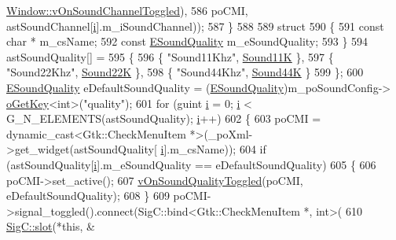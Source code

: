 \begin{DoxyCode}
{{      \mbox{\hyperlink{class_v_b_a_1_1_window_aa64899ec70d7a82ab4eee24567585f3b}{Window::vOnSoundChannelToggled}}),
586                                       poCMI, astSoundChannel[\mbox{\hyperlink{expr-lex_8cpp_acb559820d9ca11295b4500f179ef6392}{i}}].m\_iSoundChannel));
587   \}
588 
589   \textcolor{keyword}{struct}
590   \{
591     \textcolor{keyword}{const} \textcolor{keywordtype}{char} *        m\_csName;
592     \textcolor{keyword}{const} \mbox{\hyperlink{class_v_b_a_1_1_window_a320f2aa064d602888b12cdd2ebfbb3c8}{ESoundQuality}} m\_eSoundQuality;
593   \}
594   astSoundQuality[] =
595   \{
596     \{ \textcolor{stringliteral}{"Sound11Khz"}, \mbox{\hyperlink{class_v_b_a_1_1_window_a320f2aa064d602888b12cdd2ebfbb3c8ae48098f9ed61e7a8daa78de6d3ebcebc}{Sound11K}} \},
597     \{ \textcolor{stringliteral}{"Sound22Khz"}, \mbox{\hyperlink{class_v_b_a_1_1_window_a320f2aa064d602888b12cdd2ebfbb3c8ace1672910e11fc0f1c86e6c36b5ec302}{Sound22K}} \},
598     \{ \textcolor{stringliteral}{"Sound44Khz"}, \mbox{\hyperlink{class_v_b_a_1_1_window_a320f2aa064d602888b12cdd2ebfbb3c8a7217e9ed9810a4897c3d3b60d9aa8812}{Sound44K}} \}
599   \};
600   \mbox{\hyperlink{class_v_b_a_1_1_window_a320f2aa064d602888b12cdd2ebfbb3c8}{ESoundQuality}} eDefaultSoundQuality = (\mbox{\hyperlink{class_v_b_a_1_1_window_a320f2aa064d602888b12cdd2ebfbb3c8}{ESoundQuality}})m\_poSoundConfig->
      \mbox{\hyperlink{class_v_b_a_1_1_config_1_1_section_ab169d7aae4e9dde91418ba1668e3ad39}{oGetKey}}<\textcolor{keywordtype}{int}>(\textcolor{stringliteral}{"quality"});
601   \textcolor{keywordflow}{for} (guint \mbox{\hyperlink{expr-lex_8cpp_acb559820d9ca11295b4500f179ef6392}{i}} = 0; \mbox{\hyperlink{expr-lex_8cpp_acb559820d9ca11295b4500f179ef6392}{i}} < G\_N\_ELEMENTS(astSoundQuality); \mbox{\hyperlink{expr-lex_8cpp_acb559820d9ca11295b4500f179ef6392}{i}}++)
602   \{
603     poCMI = \textcolor{keyword}{dynamic\_cast<}Gtk::CheckMenuItem *\textcolor{keyword}{>}(\_poXml->get\_widget(astSoundQuality[
      \mbox{\hyperlink{expr-lex_8cpp_acb559820d9ca11295b4500f179ef6392}{i}}].m\_csName));
604     \textcolor{keywordflow}{if} (astSoundQuality[\mbox{\hyperlink{expr-lex_8cpp_acb559820d9ca11295b4500f179ef6392}{i}}].m\_eSoundQuality == eDefaultSoundQuality)
605     \{
606       poCMI->set\_active();
607       \mbox{\hyperlink{class_v_b_a_1_1_window_ae0ea496e382a463114dab0895698fed7}{vOnSoundQualityToggled}}(poCMI, eDefaultSoundQuality);
608     \}
609     poCMI->signal\_toggled().connect(SigC::bind<Gtk::CheckMenuItem *, int>(
610                                       \mbox{\hyperlink{namespace_sig_c_a92e4f19202b77e78ac1db05f5a62f6b6}{SigC::slot}}(*\textcolor{keyword}{this}, &
}}
\end{DoxyCode}
